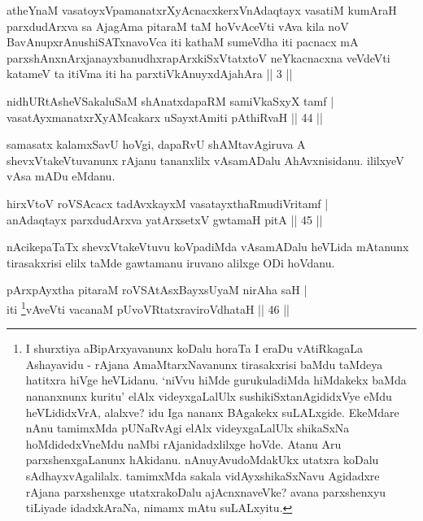 \begin{kandikeshl}
atheYnaM vasatoyxVpamanatxrXyAcnacxkerxV\s nAdaqtayx vasatiM kumAraH parxdudArxva sa AjagAma pitaraM taM hoVvAceVti vAva kila noV BavAnupxrAnushiSATxnavoVca iti kathaM sumeVdha iti pacnacx mA parxshAnxnArxjanayxbanudhxrapArxkiSxVtatxtoV neYkacnacxna veVdeVti katameV ta itiVma iti ha parxtiVkAnuyxdAjahAra || 3 ||
\end{kandikeshl}


\begin{shl}
nidhURtAsheVSakaluSaM shAnatxdapaRM samiVkaSxyX tamf | \\
vasatAyx\s \s manatxrXyAMcakarx uSayxtAmiti pAthiRvaH \hfill|| 44 || 
\end{shl}

\begin{artha}
samasatx kalamxSavU hoVgi, dapaRvU shAMtavAgiruva A 
shevxVtakeVtuvanunx rAjanu tananxlilx vAsamADalu AhAvxnisidanu. 
ililxyeV vAsa mADu eMdanu.
\end{artha}


\begin{shl}
hirxVtoV roVSAcacx tadAvxkayxM vasatayxthaRmudiVritamf | \\
anAdaqtayx parxdudArxva yatArx\s \s setxV gwtamaH pitA \hfill|| 45 || 
\end{shl}

\begin{artha}
nAcikepaTaTx shevxVtakeVtuvu koVpadiMda vAsamADalu heVLida mAtanunx 
tirasakxrisi elilx taMde gawtamanu iruvano alilxge ODi hoVdanu.
\end{artha}

\begin{shl}
pArxpAyxtha pitaraM roVSAtAsxBayxsUyaM nirAha saH | \\
iti \footnote{I shurxtiya aBipArxyavanunx koDalu horaTa I eraDu  vAtiRkagaLa Ashayavidu - rAjana AmaMtarxNavanunx tirasakxrisi baMdu  taMdeya hatitxra hiVge heVLidanu. `niVvu hiMde gurukuladiMda hiMdakekx  baMda nananxnunx kuritu' elAlx videyxgaLalUlx sushikiSxtanAgididxVye  eMdu heVLididxVrA, alalxve? idu Iga nananx BAgakekx suLALxgide.  EkeMdare nAnu tamimxMda pUNaRvAgi elAlx videyxgaLalUlx shikaSxNa  hoMdidedxVneMdu naMbi rAjanidadxlilxge hoVde. Atanu Aru  parxshenxgaLanunx hAkidanu. nAnu\break yAvudoMdakUkx utatxra koDalu  sAdhayxvAgalilalx. tamimxMda sakala vidAyxshikaSxNavu Agidadxre rAjana  parxshenxge utatxrakoDalu ajAcnxnaveVke? avana parxshenxyu tiLiyade  idadxkAraNa, nimamx mAtu suLALxyitu.}vAveVti vacanaM pUvoVRtatxraviroVdhataH \hfill|| 46 || 
\end{shl}


